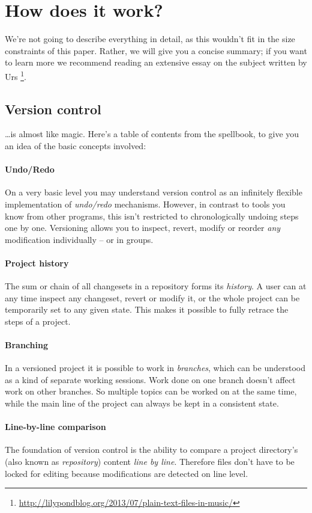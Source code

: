 \documentclass[11pt,a4paper]{article}
\begin{document}
\section{How does it work?}
We're not going to describe everything in detail, as this wouldn't fit in the size
constraints of this paper.  Rather, we will give you a concise summary; if you want
to learn more we recommend reading an extensive essay on the subject written by Urs%
\footnote{\url{http://lilypondblog.org/2013/07/plain-text-files-in-music/}}.

\subsection{Version control}
\ldots is almost like magic.  Here's a table of contents from the spellbook,
to give you an idea of the basic concepts involved:

\paragraph{Undo/Redo}
On a very basic level you may understand version control as an infinitely flexible
implementation of \emph{undo/redo} mechanisms. However, in contrast to tools you
know from other programs, this isn't restricted to chronologically undoing steps one by
one. Versioning allows you to inspect, revert, modify or reorder \emph{any} modification
individually -- or in groups.

\paragraph{Project history}
The sum or chain of all changesets in a repository forms its \emph{history}. A user can 
at any time inspect any changeset, revert or modify it, or the whole project can be
temporarily set to any given state. This makes it possible to fully retrace the steps
of a project.

\paragraph{Branching}
In a versioned project it is possible to work in \emph{branches}, which can be
understood as a kind of separate working sessions. Work done on one branch doesn't affect
work on other branches. So multiple topics can be worked on at the same time, while
the main line of the project can always be kept in a consistent state.

\paragraph{Line-by-line comparison}
The foundation of version control is the ability to compare a project directory's (also
known as \emph{repository}) content \emph{line by line}. Therefore files don't have to
be locked for editing because modifications are detected on line level.
\end{document}
